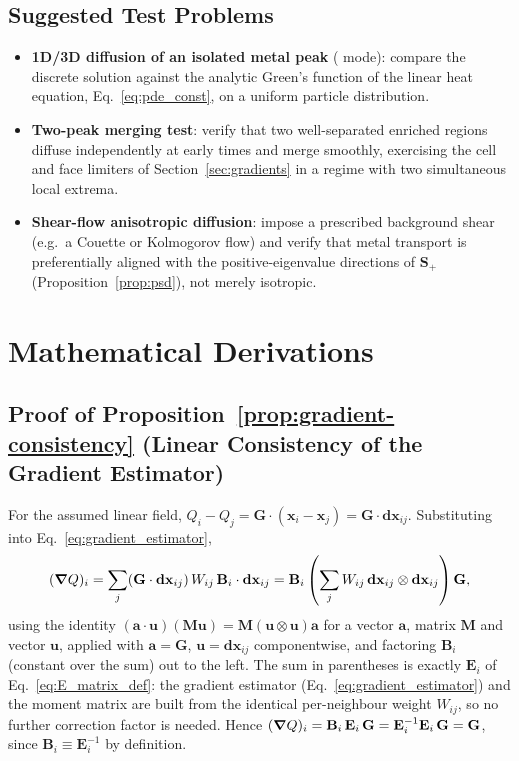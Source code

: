 \documentclass[11pt, a4paper, parskip]{scrartcl}
\newcommand{\code}[1]{\texttt{\seqsplit{#1}}}
\theoremstyle{plain}
\theoremstyle{definition}
\newcommand{\Splus}{\mathbf{S}_{+}}                       %
\begin{document}
\subsection{Suggested Test Problems}
\begin{itemize}
  \item \textbf{1D/3D diffusion of an isolated metal peak}
        (\code{isotropic\_constant} mode): compare the discrete solution
        against the analytic Green's function of the linear heat
        equation, Eq.~\eqref{eq:pde_const}, on a uniform particle
        distribution.
  \item \textbf{Two-peak merging test}: verify that two well-separated
        enriched regions diffuse independently at early times and merge
        smoothly, exercising the cell and face limiters of
        Section~\ref{sec:gradients} in a regime with two simultaneous
        local extrema.
  \item \textbf{Shear-flow anisotropic diffusion}: impose a prescribed
        background shear (e.g.\ a Couette or Kolmogorov flow) and verify
        that metal transport is preferentially aligned with the
        positive-eigenvalue directions of $\Splus$
        (Proposition~\ref{prop:psd}), not merely isotropic.
\end{itemize}

\appendix

\section{Mathematical Derivations}

\subsection{Proof of Proposition~\ref{prop:gradient-consistency} (Linear Consistency of the Gradient Estimator)}
\label{app:gradient-consistency-proof}
For the assumed linear field, $Q_i - Q_j = \mathbf G\cdot(\mathbf x_i -
\mathbf x_j) = \mathbf G \cdot \mathbf{dx}_{ij}$. Substituting into
Eq.~\eqref{eq:gradient_estimator},
\begin{equation}
  (\grad Q)_i = \sum_j (\mathbf G\cdot\mathbf{dx}_{ij})\, W_{ij}\, \mathbf B_i \cdot \mathbf{dx}_{ij}
  = \mathbf B_i \left(\sum_j W_{ij}\, \mathbf{dx}_{ij}\otimes\mathbf{dx}_{ij}\right) \mathbf G ,
\end{equation}
using the identity $(\mathbf a\cdot\mathbf u)(\mathbf M\mathbf u) =
\mathbf M(\mathbf u\otimes\mathbf u)\mathbf a$ for a vector $\mathbf a$,
matrix $\mathbf M$ and vector $\mathbf u$, applied with $\mathbf a =
\mathbf G$, $\mathbf u=\mathbf{dx}_{ij}$ componentwise, and factoring
$\mathbf B_i$ (constant over the sum) out to the left. The sum in
parentheses is exactly $\mathbf E_i$ of Eq.~\eqref{eq:E_matrix_def}: the
gradient estimator (Eq.~\eqref{eq:gradient_estimator}) and the moment
matrix are built from the identical per-neighbour weight $W_{ij}$, so no
further correction factor is needed. Hence
$(\grad Q)_i = \mathbf B_i\, \mathbf E_i\, \mathbf G = \mathbf E_i^{-1}\mathbf E_i\, \mathbf G = \mathbf G$,
since $\mathbf B_i \equiv \mathbf E_i^{-1}$ by definition.
\end{document}
